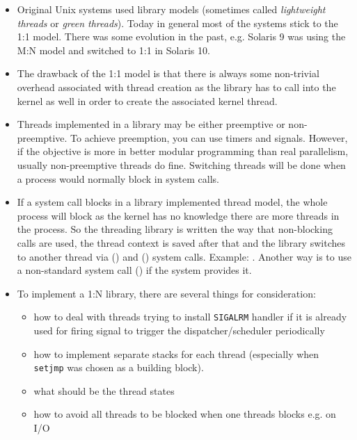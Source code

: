 \begin{itemize}
\item Original Unix systems used library models (sometimes called
\emph{lightweight threads} or \emph{green threads}). Today in general
most of the systems stick to the 1:1 model. There was some evolution in
the past, e.g. Solaris 9 was using the M:N model and switched to 1:1 in
Solaris 10.
\item The drawback of the 1:1 model is that there is always some non-trivial
overhead associated with thread creation as the library has to call into the
kernel as well in order to create the associated kernel thread.
\item Threads implemented in a library may be either preemptive or
non-pre\-emp\-tive. To achieve preemption, you can use timers and signals.
However, if the objective is more in better modular programming than real
parallelism, usually non-preemptive threads do fine.  Switching threads will be
done when a process would normally block in system calls.
\item \label{SETJMP} If a system call blocks in a library implemented thread
model, the whole process will block as the kernel has no knowledge there are
more threads in the process.  So the threading library is written the way that
non-blocking calls are used, the thread context is saved after that and the
library switches to another thread via () and ()
system calls.  Example: .  Another way is to use a
non-standard system call () if the system provides it.
\item To implement a 1:N library, there are several things for consideration:
\begin{itemize}
\item how to deal with threads trying to install \texttt{SIGALRM} handler
if it is already used for firing signal to trigger the dispatcher/scheduler
periodically
\item how to implement separate stacks for each thread (especially when
\texttt{setjmp} was chosen as a building block).
\item what should be the thread states
\item how to avoid all threads to be blocked when one threads blocks e.g. on I/O
\end{itemize}
\end{itemize}

